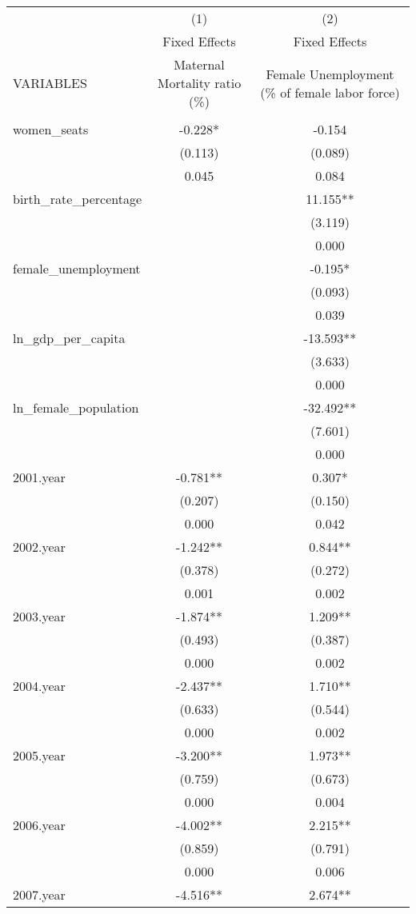 \begin{tabular}{lcc} \hline
 & (1) & (2) \\
 & Fixed Effects & Fixed Effects \\
VARIABLES & Maternal Mortality ratio (\%) & Female Unemployment (\% of female labor force) \\ \hline
 &  &  \\
women\_seats & -0.228* & -0.154 \\
 & (0.113) & (0.089) \\
 & 0.045 & 0.084 \\
birth\_rate\_percentage &  & 11.155** \\
 &  & (3.119) \\
 &  & 0.000 \\
female\_unemployment &  & -0.195* \\
 &  & (0.093) \\
 &  & 0.039 \\
ln\_gdp\_per\_capita &  & -13.593** \\
 &  & (3.633) \\
 &  & 0.000 \\
ln\_female\_population &  & -32.492** \\
 &  & (7.601) \\
 &  & 0.000 \\
2001.year & -0.781** & 0.307* \\
 & (0.207) & (0.150) \\
 & 0.000 & 0.042 \\
2002.year & -1.242** & 0.844** \\
 & (0.378) & (0.272) \\
 & 0.001 & 0.002 \\
2003.year & -1.874** & 1.209** \\
 & (0.493) & (0.387) \\
 & 0.000 & 0.002 \\
2004.year & -2.437** & 1.710** \\
 & (0.633) & (0.544) \\
 & 0.000 & 0.002 \\
2005.year & -3.200** & 1.973** \\
 & (0.759) & (0.673) \\
 & 0.000 & 0.004 \\
2006.year & -4.002** & 2.215** \\
 & (0.859) & (0.791) \\
 & 0.000 & 0.006 \\
2007.year & -4.516** & 2.674** \\

\end{tabular}
